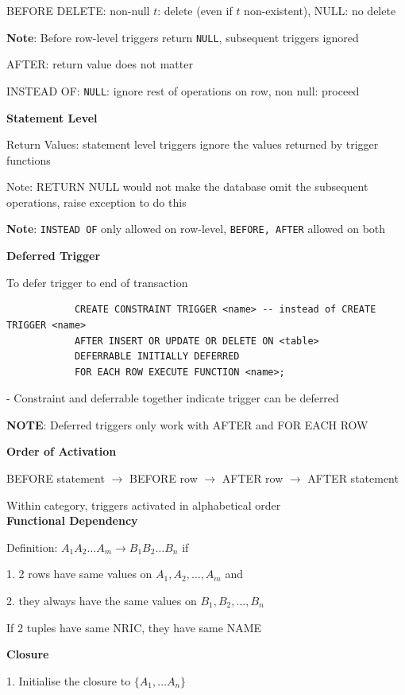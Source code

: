 \documentclass[10pt, a4paper]{article}
\newcommand{\highlight}[1]{{\color{red}\textbf{#1}}}
\newcommand{\red}[1]{{\color{red}#1}}
\newcommand{\header}[1]{{\normalsize\textbf{#1}}}
\begin{document}
\begin{multicols*}{3}
		BEFORE DELETE: non-null $t$: delete (even if $t$ non-existent), NULL: no delete

		\highlight{Note}: Before row-level triggers return \texttt{NULL}, subsequent triggers ignored

		AFTER: return value does not matter

		INSTEAD OF: \texttt{NULL}: ignore rest of operations on row, non null: proceed

		\textbf{Statement Level}

		Return Values: statement level triggers \red{ignore} the values returned by trigger functions

		\red{Note}: RETURN NULL would \red{not} make the database omit the subsequent operations, raise exception to do this

		\highlight{Note}: \texttt{INSTEAD OF} only allowed on row-level, \texttt{BEFORE, AFTER} allowed on both

		\textbf{Deferred Trigger}

		To defer trigger to end of transaction
		\begin{verbatim}
			CREATE CONSTRAINT TRIGGER <name> -- instead of CREATE TRIGGER <name>
			AFTER INSERT OR UPDATE OR DELETE ON <table>
			DEFERRABLE INITIALLY DEFERRED 
			FOR EACH ROW EXECUTE FUNCTION <name>;
		\end{verbatim}
		- \red{Constraint and deferrable together} indicate trigger can be deferred 

		\highlight{NOTE}: Deferred triggers only work with AFTER and FOR EACH ROW

		\textbf{Order of Activation}

		BEFORE statement $\rightarrow$ BEFORE row $\rightarrow$ AFTER row $\rightarrow$ AFTER statement

		Within category, triggers activated in alphabetical order\\

		\header{Functional Dependency}

		Definition: \texttt{$A_1A_2 \dots A_m \rightarrow B_1B_2 \dots B_n$} if 

		1. 2 rows have same values on $A_1, A_2, \dots , A_m$ and

		2. they always have the same values on $B_1, B_2, \dots , B_n$

		If 2 tuples have same NRIC, they have same NAME

		\textbf{Closure}

		1. Initialise the closure to $\{A_1, \dots A_n\}$


\end{multicols*}
\end{document}

